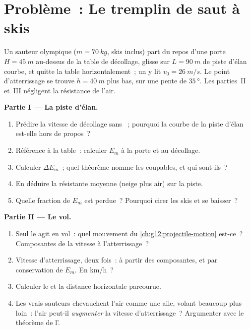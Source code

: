 \section{Problème~: Le tremplin de saut à skis}

\begin{problem}
\label{pb:g12:work-and-energy:1}
Un sauteur olympique ($m = \qty{70}{kg}$, skis inclus) part du repos
d'une porte $H = \qty{45}{m}$ au-dessus de la table de décollage,
glisse sur $L = \qty{90}{m}$ de piste d'élan courbe, et quitte la
table horizontalement~; un  y lit $v_0 = \qty{26}{m/s}$. Le
point d'atterrissage se trouve $h = \qty{40}{m}$ plus bas, sur une
pente de $\qty{35}{\degree}$. Les parties~II et~III négligent la
résistance de l'air.

\medskip\noindent\textbf{Partie I --- La piste d'élan.}
\begin{enumerate}
  \item Prédire la vitesse de décollage sans ~; pourquoi la
        courbe de la piste d'élan est-elle hors de propos~?
  \item Référence à la table~: calculer $E_m$ à la porte et au
        décollage.
  \item Calculer $\Delta E_m$~; quel théorème nomme les coupables, et
        qui sont-ils~?
  \item En déduire la  résistante
        moyenne (neige plus air) sur la piste.
  \item Quelle fraction de $E_m$ est perdue~? Pourquoi cirer les skis
        et se baisser~?
\end{enumerate}

\medskip\noindent\textbf{Partie II --- Le vol.}
\begin{enumerate}[resume]
  \item Seul le  agit en vol~: quel mouvement du
        \cref{ch:g12:projectile-motion} est-ce~? Composantes de la
        vitesse à l'atterrissage~?
  \item Vitesse d'atterrissage, deux fois~: à partir des composantes,
        et par conservation de $E_m$. En \unit{km/h}~?
  \item Calculer le  et la distance horizontale parcourue.
  \item Les vrais sauteurs chevauchent l'air comme une aile, volant
        beaucoup plus loin~: l'air peut-il \emph{augmenter} la
        vitesse d'atterrissage~? Argumenter avec le théorème de
        l'.
\end{enumerate}


\end{problem}
